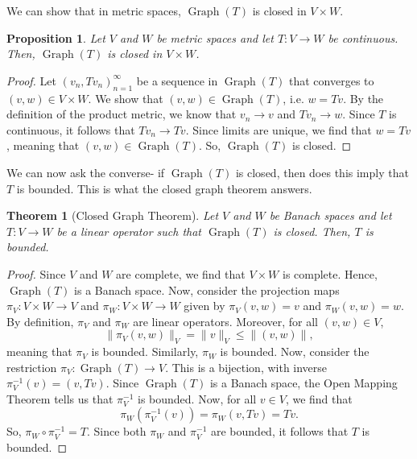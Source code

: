 \documentclass[a4paper, openany]{memoir}
\theoremstyle{definition}
\theoremstyle{plain}
\newtheorem{theorem}[definition]{Theorem}
\newtheorem{proposition}[definition]{Proposition}
\begin{document}
    We can show that in metric spaces, $\operatorname{Graph}(T)$ is closed in $V \times W$.
    \begin{proposition}
        Let $V$ and $W$ be metric spaces and let $T \colon V \to W$ be continuous. Then, $\operatorname{Graph}(T)$ is closed in $V \times W$.
    \end{proposition}
    \begin{proof}
        Let $(v_n, Tv_n)_{n=1}^\infty$ be a sequence in $\operatorname{Graph}(T)$ that converges to $(v, w) \in V \times W$. We show that $(v, w) \in \operatorname{Graph}(T)$, i.e. $w = Tv$. By the definition of the product metric, we know that $v_n \to v$ and $Tv_n \to w$. Since $T$ is continuous, it follows that $Tv_n \to Tv$. Since limits are unique, we find that $w = Tv$, meaning that $(v, w) \in \operatorname{Graph}(T)$. So, $\operatorname{Graph}(T)$ is closed.
    \end{proof}
    \noindent We can now ask the converse- if $\operatorname{Graph}(T)$ is closed, then does this imply that $T$ is bounded. This is what the closed graph theorem answers.
    \begin{theorem}[Closed Graph Theorem]
        Let $V$ and $W$ be Banach spaces and let $T \colon V \to W$ be a linear operator such that $\operatorname{Graph}(T)$ is closed. Then, $T$ is bounded.
    \end{theorem}
    \begin{proof}
        Since $V$ and $W$ are complete, we find that $V \times W$ is complete. Hence, $\operatorname{Graph}(T)$ is a Banach space. Now, consider the projection maps $\pi_V \colon V \times W \to V$ and $\pi_W \colon V \times W \to W$ given by $\pi_V(v, w) = v$ and $\pi_W(v, w) = w$. By definition, $\pi_V$ and $\pi_W$ are linear operators. Moreover, for all $(v, w) \in V$,
        \[\lVert \pi_V(v, w) \rVert_V = \lVert v \rVert_V \leq \lVert (v, w) \rVert,\]
        meaning that $\pi_V$ is bounded. Similarly, $\pi_W$ is bounded. Now, consider the restriction $\pi_V \colon \operatorname{Graph}(T) \to V$. This is a bijection, with inverse $\pi_V^{-1}(v) = (v, Tv)$. Since $\operatorname{Graph}(T)$ is a Banach space, the Open Mapping Theorem tells us that $\pi_V^{-1}$ is bounded. Now, for all $v \in V$, we find that 
        \[\pi_W(\pi_V^{-1}(v)) = \pi_W(v, Tv) = Tv.\]
        So, $\pi_W \circ \pi_V^{-1} = T$. Since both $\pi_W$ and $\pi_V^{-1}$ are bounded, it follows that $T$ is bounded.
    \end{proof}
\end{document}
